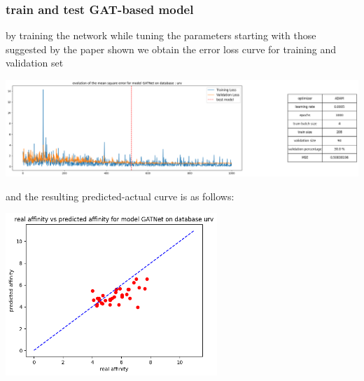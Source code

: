 \documentclass[11pt, a4paper]{article}
\begin{document}
        \subsubsection{train and test GAT-based model}
        by training the network while tuning the parameters starting with those suggested by the paper shown we obtain the error loss curve for training and validation set 
        \begin{center}
            \includegraphics[width=1.0\textwidth]{train_test_plots/URV GAT train.png}
        \end{center}
        and the resulting predicted-actual curve is as follows:
        \begin{center}
            \includegraphics[width=0.6\textwidth]{train_test_plots/URV GAT test.png}
        \end{center}
\end{document}
